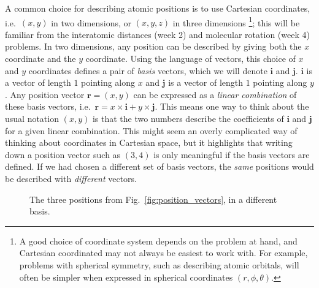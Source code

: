 \documentclass[a4paper]{article}
\renewcommand{\vec}[1]{\mathbf{#1}}
\begin{document}
A common choice for describing atomic positions is to use Cartesian coordinates, i.e.~$(x,y)$ in two dimensions, or $(x,y,z)$ in three dimensions \footnote{A good choice of coordinate system depends on the problem at hand, and Cartesian coordinated may not always be easiest to work with. For example, problems with spherical symmetry, such as describing atomic orbitals, will often be simpler when expressed in spherical coordinates $(r, \phi, \theta)$.}; this will be familiar from the interatomic distances (week 2) and molecular rotation (week 4) problems. In two dimensions, any position can be described by giving both the $x$ coordinate and the $y$ coordinate. Using the language of vectors, this choice of $x$ and $y$ coordinates defines a pair of \emph{basis} vectors, which we will denote $\vec{i}$ and $\vec{j}$. $\vec{i}$ is a vector of length $1$ pointing along $x$ and $\vec{j}$ is a vector of length $1$ pointing along $y$. Any position vector $\vec{r}=(x,y)$ can be expressed as a \emph{linear combination} of these basis vectors, i.e.\ $\vec{r} = x \times \vec{i} + y \times \vec{j}$. This means one way to think about the usual notation $(x,y)$ is that the two numbers describe the coefficients of $\vec{i}$ and $\vec{j}$ for a given linear combination. This might seem an overly complicated way of thinking about coordinates in Cartesian space, but it highlights that writing down a position vector such as $(3,4)$ is only meaningful if the basis vectors are defined. If we had chosen a different set of basis vectors, the \emph{same} positions would be described with \emph{different} vectors.
\begin{figure}[tb]
  \centering
    \caption{\label{fig:position_vectors_alternate_basis}The three positions from Fig.~\ref{fig:position_vectors}, in a different basis.}
\end{figure}
\end{document}
